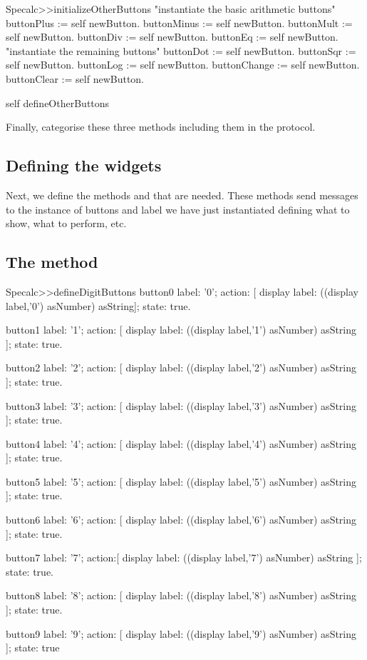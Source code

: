 \documentclass[a4paper,10pt,twoside]{book}
\begin{document}
\begin{code}{}
Specalc>>initializeOtherButtons
	"instantiate the basic arithmetic buttons"
	buttonPlus := self newButton.
	buttonMinus := self	newButton.
	buttonMult := self newButton.
	buttonDiv := self newButton.
	buttonEq := self newButton.
	"instantiate the remaining buttons"
	buttonDot := self newButton.
	buttonSqr := self newButton.
	buttonLog := self newButton.
	buttonChange := self newButton.
	buttonClear := self newButton.
	
	self defineOtherButtons
\end{code}


Finally, categorise these three methods including them in the  protocol. 
\subsection{ Defining the widgets}
Next, we define the methods   and  that are needed. These methods send messages to the instance of buttons and label we have just instantiated defining what to show, what to perform, etc.
\subsection{ The  method}

\begin{code}{}
Specalc>>defineDigitButtons
	button0
		label: '0';
		action: [ display label: ((display label,'0') asNumber) asString];
		state: true.
		
	button1
		label: '1';
		action:  [ display label: ((display label,'1') asNumber) asString ];
		state: true.
		
	button2
		label: '2';
		action: [ display label: ((display label,'2') asNumber) asString ];
		state: true.
		
	button3
		label: '3';
		action: [ display label: ((display label,'3') asNumber) asString ];
		state: true.
		
	button4
		label: '4';
		action: [ display label: ((display label,'4') asNumber) asString ];
		state: true.
		
	button5
		label: '5';
		action: [ display label: ((display label,'5') asNumber) asString ];
		state: true.

	button6
		label: '6';
		action: [ display label: ((display label,'6') asNumber) asString ];
		state: true.
		
	button7
		label: '7';
		action:[ display label: ((display label,'7') asNumber) asString ];
		state: true.

	button8
		label: '8';
		action: [ display label: ((display label,'8') asNumber) asString ];
		state: true.
		
	button9
		label: '9';
		action: [ display label: ((display label,'9') asNumber) asString ];
		state: true
\end{code}
\end{document}

